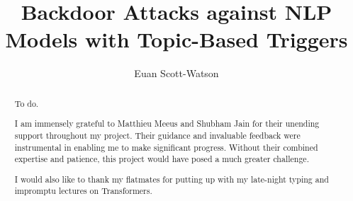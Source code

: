 \documentclass[a4paper, twoside]{report}
\title{Backdoor Attacks against NLP Models with Topic-Based Triggers}
\author{Euan Scott-Watson}
\begin{document}


\begin{abstract}
    To do.
\end{abstract}

\renewcommand{\abstractname}{Acknowledgements}
\begin{abstract}
    I am immensely grateful to Matthieu Meeus and Shubham Jain for their unending support throughout my project. Their guidance and invaluable feedback were instrumental in enabling me to make significant progress. Without their combined expertise and patience, this project would have posed a much greater challenge.

    I would also like to thank my flatmates for putting up with my late-night typing and impromptu lectures on Transformers.
\end{abstract}

\tableofcontents












\end{document}
